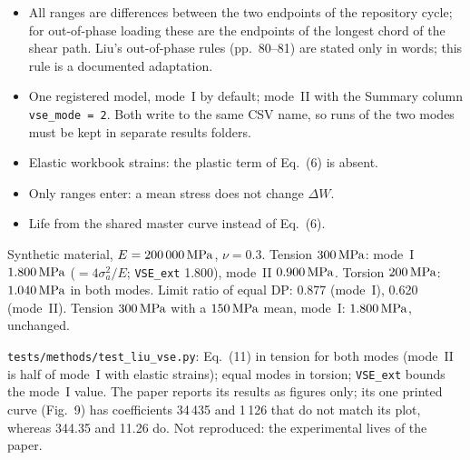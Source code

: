 \begin{itemize}
\item All ranges are differences between the two endpoints of the repository cycle; for
  out-of-phase loading these are the endpoints of the longest chord of the shear path. Liu's
  out-of-phase rules (pp.~80--81) are stated only in words; this rule is a documented adaptation.
\item One registered model, mode~I by default; mode~II with the Summary column
  \texttt{vse\_mode = 2}. Both write to the same CSV name, so runs of the two modes must be kept in
  separate results folders.
\item Elastic workbook strains: the plastic term of Eq.~(6) is absent.
\item Only ranges enter: a mean stress does not change $\Delta W$.
\item Life from the shared master curve instead of Eq.~(6).
\end{itemize}

 Synthetic material, $E=200\,000\,\mathrm{MPa}$, $\nu=0.3$. Tension $300\,\mathrm{MPa}$:
mode~I $1.800\,\mathrm{MPa}$ ($=4\sigma_a^2/E$; \texttt{VSE\_ext} 1.800), mode~II $0.900\,\mathrm{MPa}$. Torsion
$200\,\mathrm{MPa}$: $1.040\,\mathrm{MPa}$ in both modes. Limit ratio of equal DP: 0.877 (mode~I), 0.620 (mode~II).
Tension $300\,\mathrm{MPa}$ with a $150\,\mathrm{MPa}$ mean, mode~I: $1.800\,\mathrm{MPa}$, unchanged.

 \texttt{tests/methods/test\_liu\_vse.py}: Eq.~(11) in tension for both modes
(mode~II is half of mode~I with elastic strains); equal modes in torsion; \texttt{VSE\_ext} bounds
the mode~I value. The paper reports its results as figures only; its one printed curve (Fig.~9)
has coefficients 34\,435 and 1\,126 that do not match its plot, whereas 344.35 and 11.26 do. Not
reproduced: the experimental lives of the paper.
